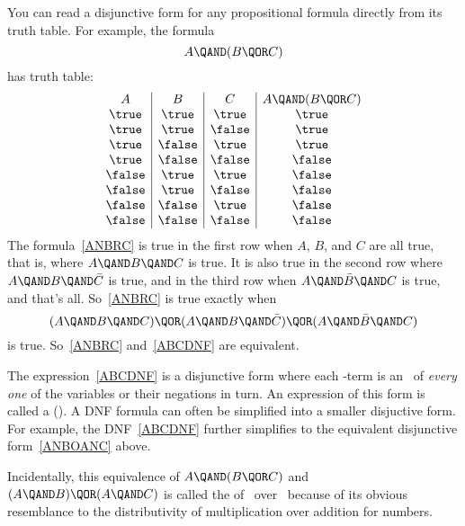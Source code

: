 You can read a disjunctive form for any propositional formula directly
from its truth table.  For example, the formula
\begin{equation}\label{ANBRC}
A \QAND (B \QOR C)
\end{equation}
has truth table:
\[\begin{array}{c|c|c|cc}
A      & B      & C       & A \QAND (B \QOR C)\label{ANBRCTT}\\
\true  & \true  & \true   &     \true\\
\true  & \true  & \false  &     \true\\
\true  & \false & \true   &     \true\\
\true  & \false & \false  &     \false\\
\false & \true  & \true   &     \false\\
\false & \true  & \false  &     \false\\
\false & \false & \true   &     \false\\
\false & \false & \false  &     \false
\end{array}\]
The formula~\eqref{ANBRC} is true in the first row when $A$, $B$, and
$C$ are all true, that is, where $A \QAND B \QAND C$ is true.  It is
also true in the second row where $A \QAND B \QAND \bar{C}$ is true,
and in the third row when $A \QAND \bar{B} \QAND C$ is true, and
that's all.  So~\eqref{ANBRC} is true exactly when
\begin{equation}\label{ABCDNF}
(A \QAND B \QAND C) \QOR (A \QAND B \QAND \bar{C}) \QOR
  (A \QAND \bar{B} \QAND C)
\end{equation}
is true.  So~\eqref{ANBRC} and~\eqref{ABCDNF} are equivalent.

The expression~\eqref{ABCDNF} is a disjunctive form where each
\QAND-term is an \QAND\ of \emph{every one} of the variables or
their negations in turn.  An expression of this form is called
a  ().  A DNF formula can
often be simplified into a smaller disjuctive form.  For example, the
DNF~\eqref{ABCDNF} further simplifies to the equivalent disjunctive
form~\eqref{ANBOANC} above.

Incidentally, this equivalence of $A \QAND (B \QOR C)$ and $(A \QAND
B) \QOR (A \QAND C)$ is called the  of \QAND\
over \QOR\ because of its obvious resemblance to the distributivity of
multiplication over addition for numbers.

